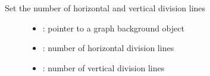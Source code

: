\documentclass[letterpaper,10pt,english]{sphinxmanual}
\begin{document}

\begin{fulllineitems}
\label{\detokenize{object-types/chart:_CPPv427lv_chart_set_div_line_countP8lv_obj_t7uint8_t7uint8_t}}%
\pysigstartmultiline
{}\label{\detokenize{object-types/chart:lv__chart_8h_1af1a1e796528f13129ee42b8ecf78345c}}%
\pysigstopmultiline
Set the number of horizontal and vertical division lines \begin{description}
\item[{}] \leavevmode\begin{itemize}
\item {} 
: pointer to a graph background object 

\item {} 
: number of horizontal division lines 

\item {} 
: number of vertical division lines 

\end{itemize}

\end{description}


\end{fulllineitems}

\end{document}
